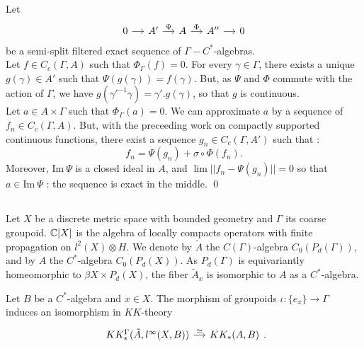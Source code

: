 \begin{dem}
Let 
\[\begin{tikzcd}[column sep = small] 0\arrow{r} & A' \arrow{r}{\Psi} & A\arrow{r}{\Phi} & A'' \arrow{r} & 0\end{tikzcd}\]
be a semi-split filtered exact sequence of $\Gamma-C^*$-algebras.\\

Let $f\in C_c(\Gamma, A)$ such that $\Phi_\Gamma(f)=0$. For every $\gamma \in \Gamma$, there exists a unique $g(\gamma)\in A'$ such that $\Psi(g(\gamma))=f(\gamma)$. But, as $\Psi$ and $\Phi$ commute with the action of $\Gamma$, we have $g(\gamma'^{-1}\gamma)=\gamma' . g(\gamma)$, so that $g$ is continuous.\\

Let $a\in A\times \Gamma$ such that $\Phi_\Gamma(a)=0$. We can approximate $a$ by a sequence of $f_n\in C_c(\Gamma,A)$. But, with the preceeding work on compactly supported continuous functions, there exist a sequence $g_n\in C_c(\Gamma, A')$ such that :
\[f_n = \Psi(g_n)+\sigma\circ \Phi(f_n).\]
Moreover, $\text{Im}\ \Psi$ is a closed ideal in $A$, and $\lim ||f_n-\Psi(g_n)||=0$ so that $a\in \text{Im} \ \Psi$ : the sequence is exact in the middle.
\qed
\end{dem}

\subsection{}
Let $X$ be a discrete metric space with bounded geometry and $\Gamma$ its coarse groupoid. $\mathbb C[X]$ is the algebra of locally compacts operators with finite propagation on $l^2(X)\otimes H$. We denote by $\tilde A $ the $C(\Gamma)$-algebra $C_0(P_d(\Gamma))$, and by $A$ the $C^*$-algebra $C_0(P_d(X))$. As $P_d(\Gamma)$ is equivariantly homeomorphic to $\beta X \times P_d(X)$, the fiber $\tilde A_x$ is isomorphic to $A$ as a $C^*$-algebra.\\

\begin{lem}
Let $B$ be a $C^*$-algebra and $x\in X$. The morphism of groupoids $\iota : \{e_x\}\rightarrow \Gamma$ induces an isomorphism in $KK$-theory 
\[\begin{tikzcd}[column sep = small] KK_*^\Gamma(\tilde A, l^\infty(X, B))\arrow{r}{\simeq} & KK_*(A, B)\end{tikzcd}.\]
\end{lem}

